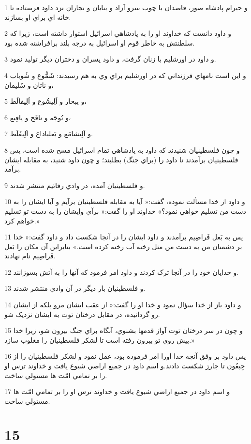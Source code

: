 \par 1 و حيرام پادشاه صور، قاصدان با چوب سرو آزاد و بنايان و نجاران نزد داود فرستاده تا خانه اي براي او بسازند.
\par 2 و داود دانست که خداوند او را به پادشاهي اسرائيل استوار داشته است، زيرا که سلطنتش به خاطر قوم او اسرائيل به درجه بلند برافراشته شده بود.
\par 3 و داود در اورشليم با زنان گرفت، و داود پسران و دختران ديگر توليد نمود.
\par 4 و اين است نامهاي فرزنداني که در اورشليم براي وي به هم رسيدند: شَمُّوع و شُوباب و ناتان و سُليمان،
\par 5 و یبحار و اَلِيشُوع و اَلِيفالَط،
\par 6 و نُوجَه و نافَج و يافِيع،
\par 7 و اَلِيشامَع و بَعلياداع و اَلِيفَلَط.
\par 8 و چون فلسطينيان شنيدند که داود به پادشاهي تمام اسرائيل مسح شده است، پس فلسطينيان برآمدند تا داود را (براي جنگ) بطلبند؛ و چون داود شنيد، به مقابله ايشان برآمد.
\par 9 و فلسطينيان آمده، در وادي رفائيم منتشر شدند.
\par 10 و داود از خدا مسألت نموده، گفت:« آيا به مقابله فلسطينيان برآيم و آيا ايشان را به دست من تسليم خواهي نمود؟» خداوند او را گفت:« برآي وايشان را به دست تو تسليم خواهم کرد.»
\par 11 پس به بَعل فَراصِيم برآمدند و داود ايشان را در آنجا شکست داد و داود گفت:« خدا بر دشمنان من به دست من مثل رخنه آب رخنه کرده است.» بنابراين آن مکان را بَعل فَراصِيم نام نهادند.
\par 12 و خدايان خود را در آنجا ترک کردند و داود امر فرمود که آنها را به آتش بسوزانند.
\par 13 و فلسطينيان بار ديگر در آن وادي منتشر شدند.
\par 14 و داود باز از خدا سؤال نمود و خدا او را گفت:« از عقب ايشان مرو بلکه از ايشان رو گردانيده، در مقابل درختان توت به ايشان نزديک شو.
\par 15 و چون در سر درختان توت آواز قدمها بشنوي، آنگاه براي جنگ بيرون شو، زيرا خدا پيش روي تو بيرون رفته است تا لشکر فلسطينيان را مغلوب سازد.»
\par 16 پس داود بر وفق آنچه خدا اورا امر فرموده بود، عمل نمود و لشکر فلسطينيان را از جِبعُون تا جارز شکست دادند.و اسم داود در جميع اراضي شيوع يافت و خداوند ترس او را بر تمامي امّت ها مستولي ساخت.
\par 17 و اسم داود در جميع اراضي شيوع يافت و خداوند ترس او را بر تمامي امّت ها مستولي ساخت. 
 
\chapter{15}

